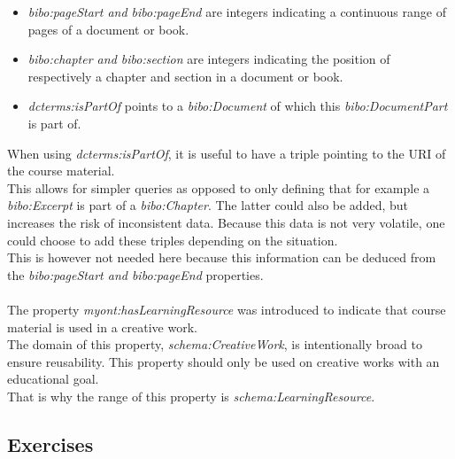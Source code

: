\documentclass[a4paper]{report}
\begin{document}
    \begin{itemize}
        \item \textit{bibo:pageStart and bibo:pageEnd} are integers indicating a continuous range of pages of a document or book.
        \item \textit{bibo:chapter and bibo:section} are integers indicating the position of respectively a chapter and section in a document or book.
        \item \textit{dcterms:isPartOf} points to a \textit{bibo:Document} of which this \textit{bibo:DocumentPart} is part of.
    \end{itemize}
    When using \textit{dcterms:isPartOf}, it is useful to have a triple pointing to the URI of the course material.\\
    This allows for simpler queries as opposed to only defining that for example a \textit{bibo:Excerpt} is part of a \textit{bibo:Chapter}.
    The latter could also be added, but increases the risk of inconsistent data. Because this data is not very volatile, one could choose to add these triples depending on the situation. \\
    This is however not needed here because this information can be deduced from the \textit{bibo:pageStart and bibo:pageEnd} properties.\\ \\
    The property \textit{myont:hasLearningResource} was introduced to indicate that course material is used in a creative work.\\
    The domain of this property, \textit{schema:CreativeWork}, is intentionally broad to ensure reusability. This property should only be used on creative works with an educational goal.\\
    That is why the range of this property is \textit{schema:LearningResource}.

    \subsection{Exercises}
    \label{subsubsection:exercises}
\end{document}
